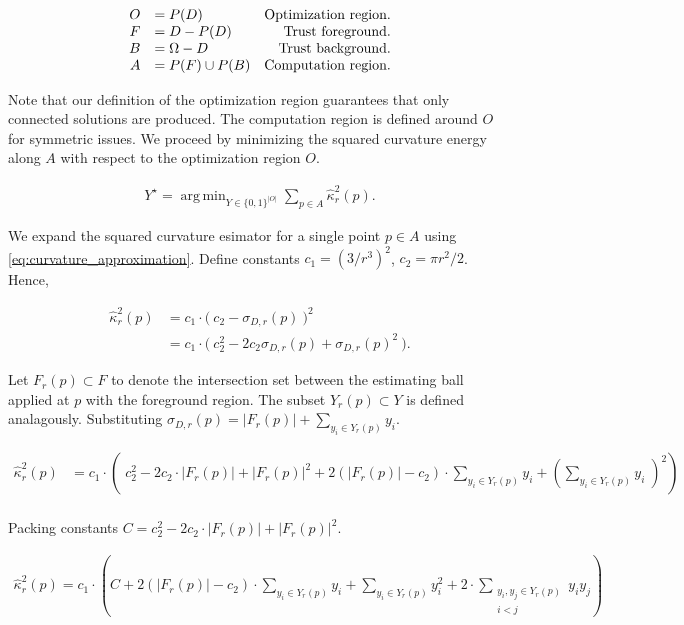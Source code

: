 \documentclass[runningheads]{llncs}
\DeclareMathOperator*{\argmin}{arg\,min}
\begin{document}
\[\arraycolsep=5pt
\begin{array}{rlr}
	O &= P(D) & \text{Optimization region.} \\
	F &= D - P(D) & \text{Trust foreground.} \\
	B &= \Omega - D & \text{Trust background.} \\
	A &= P(F) \cup P(B) & \text{Computation region}.
\end{array}
\]

Note that our definition of the optimization region guarantees that only connected solutions are produced. The computation region is defined around $O$ for symmetric issues. We proceed by minimizing the squared curvature energy along $A$ with respect to the optimization region $O$. 

\begin{align}			
	Y^{\star} = \argmin_{Y \in \{0,1\}^{|O|}} \sum_{p \in A}{\hat{\kappa}_{r}^2(p)}.
	\label{eq:curvature_highlighting_opt_problem}
\end{align}

We expand the squared curvature esimator for a single point $p \in A$ using \eqref{eq:curvature_approximation}. Define constants $c_1 = (3/r^3)^2$, $c_2=\pi r^2/2$. Hence,

\begin{align*}
\hat{\kappa}_{r}^2(p) &= c_1 \cdot \big(\: c_2 - \sigma_{D,r}(p) \: \big)^2 \\
&= c_1 \cdot \big(\: c_2^2 - 2c_2\sigma_{D,r}(p) + \sigma_{D,r}(p)^2 \: \big).
\end{align*}

Let $F_r(p) \subset F$ to denote the intersection set between the estimating ball applied at $p$ with the foreground region. The subset $Y_r(p) \subset Y$ is defined  analagously. Substituting $\sigma_{D,r}(p) = |F_r(p)| + \sum_{y_i \in Y_r(p)}{y_i}$.

	\begin{align*}
		\hat{\kappa}_{r}^2(p) &= c_1 \cdot \left( \; c_2^2 - 2c_2 \cdot |F_r(p)| + |F_r(p)|^2 + 2\left( |F_r(p)| - c_2 \right) \cdot \sum_{y_i \in Y_r(p)}{y_i}  + \left( \sum_{y_i \in Y_r(p)}{y_i} \; \right) ^2 \right) \\[1em]
	\end{align*}
	
	Packing constants $C=c_2^2 - 2c_2 \cdot |F_r(p)| + |F_r(p)|^2$.
	
	\begin{align*}
		\hat{\kappa}_{r}^2(p) = c_1 \cdot \left( C + 2\left( |F_r(p)| - c_2 \right) \cdot \sum_{y_i \in Y_r(p)}{y_i} + \sum_{y_i \in Y_r(p)}{y_i^2} + 2 \cdot \sum_{ \substack{y_i,y_j \in Y_r(p) \\ i<j} }{y_iy_j}  \right)
	\end{align*}
	
\end{document}
